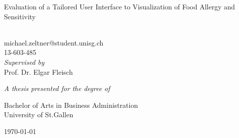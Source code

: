 
\begin{titlepage}
    \begin{center}
        \vspace*{1cm}
        
        \huge
        \textbf{\thetitle}
        
        \vspace{0.5cm}
        \Large
        Evaluation of a Tailored User Interface to Visualization of Food Allergy and Sensitivity
        
        \vspace{2.5cm}
        
        \large
        \textbf{\theauthor}\\
        michael.zeltner@student.unisg.ch\\
        13-603-485\\
        
        
        \vspace{1cm}
        \textit{Supervised by}\\
        \vspace{0.2cm}
        Prof. Dr. Elgar Fleisch
        

        \vfill
        
        \textit{A thesis presented for the degree of}\\
        
        \vspace{0.2cm}
        
        Bachelor of Arts in Business Administration\\
        University of St.Gallen\\
        
        \vspace{1.5cm}
        
        \today
        
    \end{center}
\end{titlepage}
